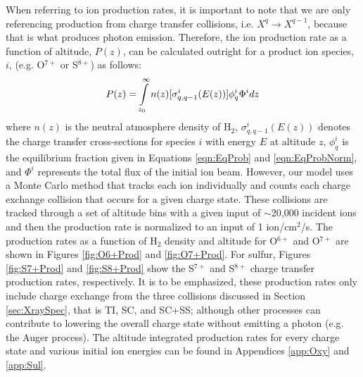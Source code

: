 \documentclass[draft]{agujournal2018}
\begin{document}
When referring to ion production rates, it is important to note that we are only referencing production from charge transfer collisions, i.e. $X^q \rightarrow X^{q-1}$, because that is what produces photon emission.
Therefore, the ion production rate as a function of altitude, $P(z)$, can be calculated outright for a product ion species, $i$, (e.g. O$^{7+}$ or S$^{8+}$) as follows:
\begin{equation}
    P(z)=\int\displaylimits_{z_0}^{\infty}n(z)[\sigma_{q,q-1}^i(E(z))]\phi_q^i\Phi^idz
\end{equation}
where $n(z)$ is the neutral atmosphere density of H$_2$, $\sigma_{q,q-1}^i(E(z))$ denotes the charge transfer cross-sections for species $i$ with energy $E$ at altitude $z$, $\phi_q^i$ is the equilibrium fraction given in Equations \ref{eqn:EqProb} and \ref{eqn:EqProbNorm}, and $\Phi^i$ represents the total flux of the initial ion beam.
However, our model uses a Monte Carlo method that tracks each ion individually and counts each charge exchange collision that occurs for a given charge state.
These collisions are tracked through a set of altitude bins with a given input of $\sim$20,000 incident ions and then the production rate is normalized to an input of 1 ion/cm$^2$/s.
The production rates as a function of H$_2$ density and altitude for O$^{6+}$ and O$^{7+}$ are shown in Figures \ref{fig:O6+Prod} and \ref{fig:O7+Prod}.
For sulfur, Figures \ref{fig:S7+Prod} and \ref{fig:S8+Prod} show the S$^{7+}$ and S$^{8+}$ charge transfer production rates, respectively.
It is to be emphasized, these production rates only include charge exchange from the three collisions discussed in Section \ref{sec:XraySpec}, that is TI, SC, and SC+SS; although other processes can contribute to lowering the overall charge state without emitting a photon (e.g. the Auger process).
The altitude integrated production rates for every charge state and various initial ion energies can be found in Appendices \ref{app:Oxy} and \ref{app:Sul}.
\end{document}
